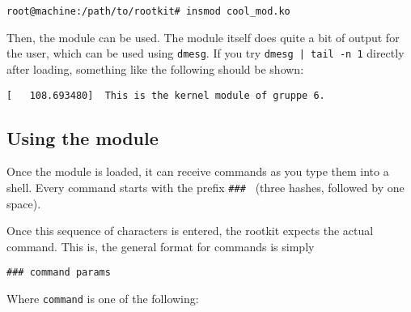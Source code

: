 \documentclass[10pt, letterpaper]{article}
\begin{document}
\begin{verbatim}
root@machine:/path/to/rootkit# insmod cool_mod.ko
\end{verbatim}

Then, the module can be used. The module itself does quite a bit of output for the user, which can be used using \texttt{dmesg}. If you try \texttt{dmesg | tail -n 1} directly after loading, something like the following should be shown:

\begin{verbatim}
[   108.693480]  This is the kernel module of gruppe 6.
\end{verbatim}

\subsection{Using the module}

Once the module is loaded, it can receive commands as you type them into a shell. Every command starts with the prefix \texttt{\#\#\# } (three hashes, followed by one space).

Once this sequence of characters is entered, the rootkit expects the actual command. This is, the general format for commands is simply

\begin{verbatim}
### command params
\end{verbatim}

Where \texttt{command} is one of the following:
\end{document}
